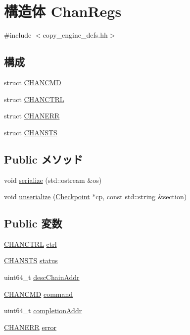\hypertarget{structCopyEngineReg_1_1ChanRegs}{
\section{構造体 ChanRegs}
\label{structCopyEngineReg_1_1ChanRegs}
}


{\ttfamily \#include $<$copy\_\-engine\_\-defs.hh$>$}\subsection*{構成}
\begin{DoxyCompactItemize}
\item 
struct \hyperlink{structCopyEngineReg_1_1ChanRegs_1_1CHANCMD}{CHANCMD}
\item 
struct \hyperlink{structCopyEngineReg_1_1ChanRegs_1_1CHANCTRL}{CHANCTRL}
\item 
struct \hyperlink{structCopyEngineReg_1_1ChanRegs_1_1CHANERR}{CHANERR}
\item 
struct \hyperlink{structCopyEngineReg_1_1ChanRegs_1_1CHANSTS}{CHANSTS}
\end{DoxyCompactItemize}
\subsection*{Public メソッド}
\begin{DoxyCompactItemize}
\item 
void \hyperlink{structCopyEngineReg_1_1ChanRegs_a53e036786d17361be4c7320d39c99b84}{serialize} (std::ostream \&os)
\item 
void \hyperlink{structCopyEngineReg_1_1ChanRegs_af22e5d6d660b97db37003ac61ac4ee49}{unserialize} (\hyperlink{classCheckpoint}{Checkpoint} $\ast$cp, const std::string \&section)
\end{DoxyCompactItemize}
\subsection*{Public 変数}
\begin{DoxyCompactItemize}
\item 
\hyperlink{structCopyEngineReg_1_1ChanRegs_1_1CHANCTRL}{CHANCTRL} \hyperlink{structCopyEngineReg_1_1ChanRegs_af2b8524103427009ad3a7ce10a03ed33}{ctrl}
\item 
\hyperlink{structCopyEngineReg_1_1ChanRegs_1_1CHANSTS}{CHANSTS} \hyperlink{structCopyEngineReg_1_1ChanRegs_af278ef315e7598554b97bb8000dee843}{status}
\item 
uint64\_\-t \hyperlink{structCopyEngineReg_1_1ChanRegs_aa9cf4f6cb95c0a8d2e17bd5095042264}{descChainAddr}
\item 
\hyperlink{structCopyEngineReg_1_1ChanRegs_1_1CHANCMD}{CHANCMD} \hyperlink{structCopyEngineReg_1_1ChanRegs_ace167821fab4ef88a005720dcc7a69b8}{command}
\item 
uint64\_\-t \hyperlink{structCopyEngineReg_1_1ChanRegs_a1513d335dd67bb62ce777b486d79315f}{completionAddr}
\item 
\hyperlink{structCopyEngineReg_1_1ChanRegs_1_1CHANERR}{CHANERR} \hyperlink{structCopyEngineReg_1_1ChanRegs_abee0af905168a3f0b6f2e6683668d301}{error}
\end{DoxyCompactItemize}


